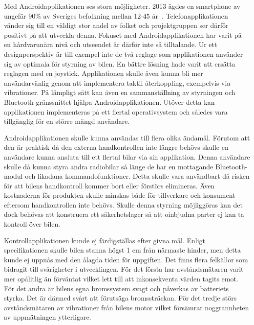 \documentclass[a4paper]{article}
\begin{document}
\vspace{5mm} \noindent
Med Androidapplikationen ses stora möjligheter. 2013 ägdes en smartphone av ungefär 90\% av Sveriges befolkning mellan 12-45 år~\cite{smartphoneStat}. Telefonapplikationen vänder sig till en väldigt stor andel av folket och projektgruppen ser därför positivt på att utveckla denna. Fokuset med Androidapplikationen har varit på en hårdvarunära nivå och utseendet är därför inte så tilltalande. Ur ett designperspektiv är till exempel inte de två reglage som applikationen använder sig av optimala för styrning av bilen. En bättre lösning hade varit att ersätta reglagen med en joystick. Applikationen skulle även kunna bli mer användarvänlig genom att implementera taktil återkoppling, exempelvis via vibrationer. På lämpligt sätt kan även en sammanställning av styrningen och Bluetooth-gränssnittet hjälpa Androidapplikationen. Utöver detta kan applikationen implementeras på ett flertal operativsystem och således vara tillgänglig för en större mängd användare. 

\vspace{5mm} \noindent
Androidapplikationen skulle kunna användas till flera olika ändamål. Förutom att den är praktisk då den externa handkontrollen inte längre behövs skulle en användare kunna ansluta till ett flertal bilar via sin applikation. Denna användare skulle då kunna styra andra radiobilar så länge de har en mottagande Bluetooth-modul och likadana kommandofunktioner. Detta skulle vara användbart då risken för att bilens handkontroll kommer bort eller förstörs elimineras. Även kostnaderna för produkten skulle minskas både för tillverkare och konsument eftersom handkontrollen inte behövs. Skulle denna styrning möjliggöras kan det dock behövas att konstruera ett säkerhetslager så att oinbjudna parter ej kan ta kontroll över bilen.



\vspace{5mm} 
\noindent
Kontrollapplikationen kunde ej färdigställas efter givna mål. Enligt specifikationen skulle bilen stanna högst 1 cm från närmaste hinder, men detta kunde ej uppnås med den ålagda tiden för uppgiften. Det finns flera felkällor som bidragit till svårigheter i utvecklingen. För det första har avståndsmätaren varit mer opålitlig än förväntat vilket lett till att inkonsekventa värden tagits emot. För det andra är bilens egna bromssystem svagt och påverkas av batteriets styrka. Det är därmed svårt att förutsäga bromssträckan. För det tredje störs avståndsmätaren av vibrationer från bilens motor vilket försämrar noggrannheten av uppmätningen ytterligare. 
\end{document}
